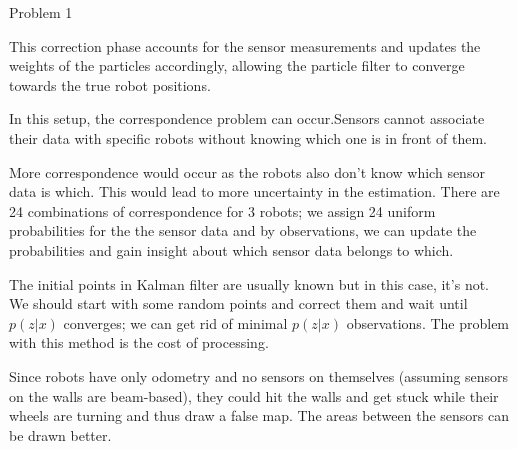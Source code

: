 \documentclass{article}
\begin{document}
\begin{problem}{Problem 1}
\begin{problem}{1.7}
This correction phase accounts for the sensor measurements and updates the weights of the particles accordingly, allowing the particle filter to converge towards the true robot positions.
\end{problem}

\begin{problem}{1.8}
In this setup, the correspondence problem can occur.Sensors cannot associate their data with specific robots without knowing which one is in front of them.
\end{problem}
\begin{problem}{1.9}
More correspondence would occur as the robots also don't know which sensor data is which. This would lead to more uncertainty in the estimation. There are 24 combinations of correspondence for 3 robots; we assign 24 uniform probabilities for the the sensor data and by observations, we can update the probabilities and gain insight about which sensor data belongs to which.
\end{problem}

\begin{problem}{1.10}
The initial points in Kalman filter are usually known but in this case, it's not. We should start with some random points and correct them and wait until $p(z|x)$ converges; we can get rid of minimal $p(z|x)$ observations. The problem with this method is the cost of processing.
\end{problem}
\begin{problem}{1.11}
Since robots have only odometry and no sensors on themselves (assuming sensors on the walls are beam-based), they could hit the walls and get stuck while their wheels are turning and thus draw a false map. The areas between the sensors can be drawn better.
\end{problem}
\end{problem}
\end{document}
